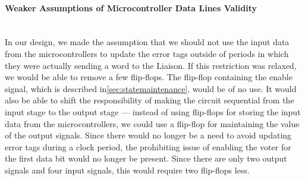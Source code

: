 \paragraph{Weaker Assumptions of Microcontroller Data Lines Validity} \hfill \\
In our design, we made the assumption that we should not use the input
data from the microcontrollers to update the error tags outside of
periods in which they were actually sending a word to the Liaison. If
this restriction was relaxed, we would be able to remove a few
flip-flops. The flip-flop containing the enable signal, which is described
in\autoref{sec:statemaintenance},
would be of no use. It would also be able to shift the responsibility
of making the circuit sequential from the input stage to the output
stage --- instead of using flip-flops for storing the input data from
the microcontrollers, we could use a flip-flop for maintaining the
value of the output signals. Since there would no longer be a need to
avoid updating error tags during a clock period, the prohibiting issue
of enabling the voter for the first data bit would no longer be
present. Since there are only two output signals and four input
signals, this would require two flip-flops less.
